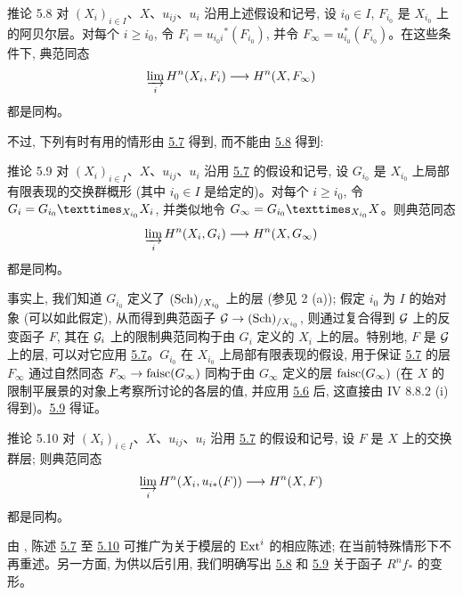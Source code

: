 \begin{enonce*}{推论 5.8}
对 $(X_i)_{i \in I}$、$X$、$u_{ij}$、$u_i$ 沿用上述假设和记号, 设 $i_0 \in I$, $F_{i_0}$ 是 $X_{i_0}$ 上的阿贝尔层。对每个 $i \geq i_0$, 令 $F_i = u_{i_0 i} {}^{\ast}(F_{i_0})$, 并令 $F_{\infty} = u^{\ast}_{i_0} (F_{i_0})$。在这些条件下, 典范同态
$$
\varinjlim_i H^n (X_i, F_i) \to H^n (X, F_{\infty})
$$
都是同构。
\end{enonce*}

不过, 下列有时有用的情形由 \hyperref[VII.thm5.7]{5.7} 得到, 而不能由 \hyperref[VII.cor5.8]{5.8} 得到:

\begin{enonce*}{推论 5.9}
对 $(X_i)_{i \in I}$、$X$、$u_{ij}$、$u_i$ 沿用 \hyperref[VII.thm5.7]{5.7} 的假设和记号, 设 $G_{i_0}$ 是 $X_{i_0}$ 上局部有限表现的交换群概形 (其中 $i_0 \in I$ 是给定的)。对每个 $i \geq i_0$, 令 $G_i = \fprod{G_{i_0}}{X_i}{X_{i_0}}$, 并类似地令 $G_{\infty} = \fprod{G_{i_0}}{X}{X_{i_0}}$。则典范同态
$$
\varinjlim_i H^n (X_i, G_i) \to H^n (X, G_{\infty})
$$
都是同构。
\end{enonce*}

事实上, 我们知道 $G_{i_0}$ 定义了 $(\operatorname{Sch})_{/X_{i_0}}$ 上的层 (参见 2 (a)); 假定 $i_0$ 为 $I$ 的始对象 (可以如此假定), 从而得到典范函子 $\Gg \to (\Sch)_{/X_{i_0}}$, 则通过复合得到 ${\mathcal G}$ 上的反变函子 $F$, 其在 ${\mathcal G}_i$ 上的限制\pageoriginale 典范同构于由 $G_i$ 定义的 $X_i$ 上的层。特别地, $F$ 是 ${\mathcal G}$ 上的层, 可以对它应用 \hyperref[VII.thm5.7]{5.7}。$G_{i_0}$ 在 $X_{i_0}$ 上局部有限表现的假设, 用于保证 \hyperref[VII.thm5.7]{5.7} 的层 $F_{\infty}$ 通过自然同态 $F_{\infty} \to \faisc(G_{\infty})$ 同构于由 $G_{\infty}$ 定义的层 $\operatorname{faisc}(G_{\infty})$ (在 $X$ 的限制平展景的对象上考察所讨论的各层的值, 并应用 \hyperref[VII.lem5.6]{5.6} 后, 这直接由 \EGA IV 8.8.2 (i) 得到)。\hyperref[VII.cor5.9]{5.9} 得证。

\begin{enonce*}{推论 5.10}
对 $(X_i)_{i \in I}$、$X$、$u_{ij}$、$u_i$ 沿用 \hyperref[VII.thm5.7]{5.7} 的假设和记号, 设 $F$ 是 $X$ 上的交换群层; 则典范同态
$$
\varinjlim_{i} H^n (X_i, u_{i\ast} (F)) \to H^n (X, F)
$$
都是同构。
\end{enonce*}

由 , 陈述 \hyperref[VII.thm5.7]{5.7} 至 \hyperref[VII.cor5.10]{5.10} 可推广为关于模层的 $\operatorname{Ext}^i$ 的相应陈述; 在当前特殊情形下不再重述。另一方面, 为供以后引用, 我们明确写出 \hyperref[VII.cor5.8]{5.8} 和 \hyperref[VII.cor5.9]{5.9} 关于函子 $R^n f_{\ast}$ 的变形。


